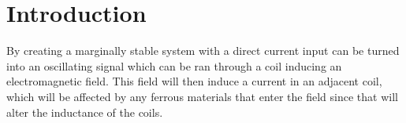 \section{Introduction}
% 

By creating a marginally stable system with a direct current input can be turned into an oscillating signal which can be ran through a coil inducing an electromagnetic field. This field will then induce a current in an adjacent coil,
which will be affected by any ferrous materials that enter the field since that will alter the inductance of the coils. 